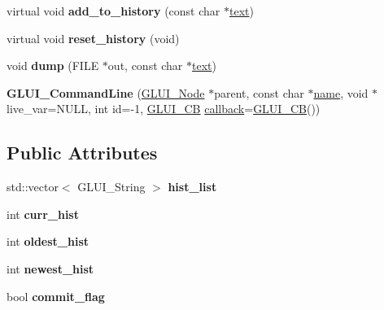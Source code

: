\begin{DoxyCompactItemize}
\item 
\hypertarget{classGLUI__CommandLine_afe7219786a93c8b0ba98bb5d7d777a54}{virtual void {\bfseries add\-\_\-to\-\_\-history} (const char $\ast$\hyperlink{classGLUI__Control_af0d60e9736f4dbc34e9a536e75876d72}{text})}\label{classGLUI__CommandLine_afe7219786a93c8b0ba98bb5d7d777a54}

\item 
\hypertarget{classGLUI__CommandLine_a837acdd1006a5f8179c0faa0cb07045b}{virtual void {\bfseries reset\-\_\-history} (void)}\label{classGLUI__CommandLine_a837acdd1006a5f8179c0faa0cb07045b}

\item 
\hypertarget{classGLUI__CommandLine_a89815aca68b849830ba26253135efaf5}{void {\bfseries dump} (F\-I\-L\-E $\ast$out, const char $\ast$\hyperlink{classGLUI__Control_af0d60e9736f4dbc34e9a536e75876d72}{text})}\label{classGLUI__CommandLine_a89815aca68b849830ba26253135efaf5}

\item 
\hypertarget{classGLUI__CommandLine_a1367881039ac1384af53f71fa35932b3}{{\bfseries G\-L\-U\-I\-\_\-\-Command\-Line} (\hyperlink{classGLUI__Node}{G\-L\-U\-I\-\_\-\-Node} $\ast$parent, const char $\ast$\hyperlink{classGLUI__Control_aa95b97d50df45335fc33f0af03958eb3}{name}, void $\ast$live\-\_\-var=N\-U\-L\-L, int id=-\/1, \hyperlink{classGLUI__CB}{G\-L\-U\-I\-\_\-\-C\-B} \hyperlink{classGLUI__Control_a96060fe0cc6d537e736dd6eef78e24ab}{callback}=\hyperlink{classGLUI__CB}{G\-L\-U\-I\-\_\-\-C\-B}())}\label{classGLUI__CommandLine_a1367881039ac1384af53f71fa35932b3}

\end{DoxyCompactItemize}
\subsection*{Public Attributes}
\begin{DoxyCompactItemize}
\item 
\hypertarget{classGLUI__CommandLine_abc9dcdc275bb36dee1a9db8d348338b5}{std\-::vector$<$ G\-L\-U\-I\-\_\-\-String $>$ {\bfseries hist\-\_\-list}}\label{classGLUI__CommandLine_abc9dcdc275bb36dee1a9db8d348338b5}

\item 
\hypertarget{classGLUI__CommandLine_ab8d88779584003b82000b824ac6f4906}{int {\bfseries curr\-\_\-hist}}\label{classGLUI__CommandLine_ab8d88779584003b82000b824ac6f4906}

\item 
\hypertarget{classGLUI__CommandLine_a689ee6f9ede7c0f6c2060fd5650b1d22}{int {\bfseries oldest\-\_\-hist}}\label{classGLUI__CommandLine_a689ee6f9ede7c0f6c2060fd5650b1d22}

\item 
\hypertarget{classGLUI__CommandLine_af4f50f57b5a239d8564619ec0779518d}{int {\bfseries newest\-\_\-hist}}\label{classGLUI__CommandLine_af4f50f57b5a239d8564619ec0779518d}

\item 
\hypertarget{classGLUI__CommandLine_ac2f61fd248c6adb663c6de52e9e431fd}{bool {\bfseries commit\-\_\-flag}}\label{classGLUI__CommandLine_ac2f61fd248c6adb663c6de52e9e431fd}

\end{DoxyCompactItemize}
